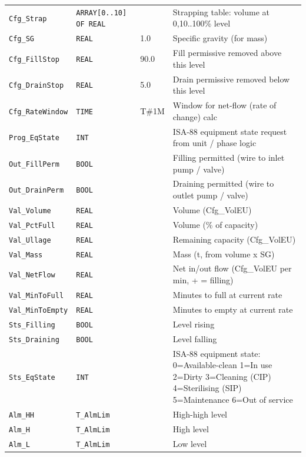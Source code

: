 \begin{small}
\begin{longtable}{@{}P{3.70cm}P{2.20cm}P{1.70cm}P{8.91cm}@{}}
\texttt{Cfg\_Strap} & \texttt{ARRAY[0..10] OF REAL} &  & Strapping table: volume at 0,10..100\% level \\
\texttt{Cfg\_SG} & \texttt{REAL} & 1.0 & Specific gravity (for mass) \\
\texttt{Cfg\_FillStop} & \texttt{REAL} & 90.0 & Fill permissive removed above this level \\
\texttt{Cfg\_DrainStop} & \texttt{REAL} & 5.0 & Drain permissive removed below this level \\
\texttt{Cfg\_RateWindow} & \texttt{TIME} & T\#1M & Window for net-flow (rate of change) calc \\
\texttt{Prog\_EqState} & \texttt{INT} &  & ISA-88 equipment state request from unit /\allowbreak{} phase logic \\
\texttt{Out\_FillPerm} & \texttt{BOOL} &  & Filling permitted (wire to inlet pump /\allowbreak{} valve) \\
\texttt{Out\_DrainPerm} & \texttt{BOOL} &  & Draining permitted (wire to outlet pump /\allowbreak{} valve) \\
\texttt{Val\_Volume} & \texttt{REAL} &  & Volume (Cfg\_VolEU) \\
\texttt{Val\_PctFull} & \texttt{REAL} &  & Volume (\% of capacity) \\
\texttt{Val\_Ullage} & \texttt{REAL} &  & Remaining capacity (Cfg\_VolEU) \\
\texttt{Val\_Mass} & \texttt{REAL} &  & Mass (t, from volume x SG) \\
\texttt{Val\_NetFlow} & \texttt{REAL} &  & Net in/\allowbreak{}out flow (Cfg\_VolEU per min, + = filling) \\
\texttt{Val\_MinToFull} & \texttt{REAL} &  & Minutes to full at current rate \\
\texttt{Val\_MinToEmpty} & \texttt{REAL} &  & Minutes to empty at current rate \\
\texttt{Sts\_Filling} & \texttt{BOOL} &  & Level rising \\
\texttt{Sts\_Draining} & \texttt{BOOL} &  & Level falling \\
\texttt{Sts\_EqState} & \texttt{INT} &  & ISA-88 equipment state: 0=Available-clean 1=In use 2=Dirty 3=Cleaning (CIP) 4=Sterilising (SIP) 5=Maintenance 6=Out of service \\
\texttt{Alm\_HH} & \texttt{T\_AlmLim} &  & High-high level \\
\texttt{Alm\_H} & \texttt{T\_AlmLim} &  & High level \\
\texttt{Alm\_L} & \texttt{T\_AlmLim} &  & Low level \\

\end{longtable}
\end{small}
